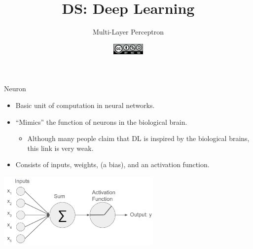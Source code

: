\documentclass[aspectratio=169]{../latex_main/tntbeamer}  %
\title[DL:Multi-Layer Perceptron]{DS: Deep Learning}
\subtitle{Multi-Layer Perceptron}
\date{\hspace{0.5em} {\includegraphics[height=1.5em]{../latex_main/figures/Cc-by-nc-sa_icon.svg.png}}}
\begin{document}
	
	\maketitle
	\begin{frame}{Neuron}

        \begin{itemize}
            \item Basic unit of computation in neural networks.
            \item ``Mimics'' the function of neurons in the biological brain.
            \begin{itemize}
                \item Although many people claim that DL is inspired by the biological brains, this link is very weak.
            \end{itemize}
            \item Consists of inputs, weights, (a bias), and an activation function.
        \end{itemize}
       
        \centering
        \includegraphics[width=0.6\textwidth]{figure/neuron.png}
                
	\end{frame}
\end{document}
